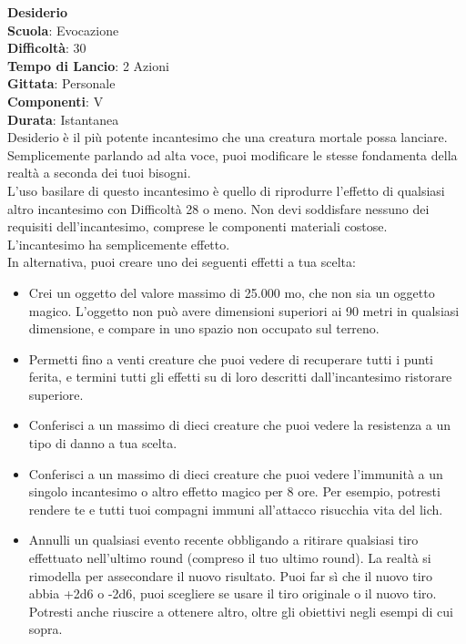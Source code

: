 \begin{multicols}{2}
\medskip\textbf{Desiderio}\\
\textbf{Scuola}: Evocazione\\
\textbf{Difficoltà}: 30\\
\textbf{Tempo di Lancio}: 2 Azioni\\
\textbf{Gittata}: Personale\\
\textbf{Componenti}: V\\
\textbf{Durata}: Istantanea\\
Desiderio è il più potente incantesimo che una creatura mortale possa lanciare. Semplicemente parlando ad alta voce, puoi modificare le stesse fondamenta della realtà a seconda dei tuoi bisogni. \\
L'uso basilare di questo incantesimo è quello di riprodurre l'effetto di qualsiasi altro incantesimo con Difficoltà 28 o meno. Non devi soddisfare nessuno dei requisiti dell'incantesimo, comprese le componenti materiali costose. L'incantesimo ha semplicemente effetto.\\
In alternativa, puoi creare uno dei seguenti effetti a tua scelta:
\begin{itemize}
	\item 
Crei un oggetto del valore massimo di 25.000 mo, che non sia un oggetto magico. L'oggetto non può avere dimensioni superiori ai 90 metri in qualsiasi dimensione, e compare in uno spazio non occupato sul terreno.
	\item 
Permetti fino a venti creature che puoi vedere di recuperare tutti i punti ferita, e termini tutti gli effetti su di loro descritti dall'incantesimo ristorare superiore. 
	\item 
Conferisci a un massimo di dieci creature che puoi vedere la resistenza a un tipo di danno a tua scelta.
	\item 
Conferisci a un massimo di dieci creature che puoi vedere l'immunità a un singolo incantesimo o altro effetto magico per 8 ore. Per esempio, potresti rendere te e tutti tuoi compagni immuni all'attacco risucchia vita del lich.
	\item 
Annulli un qualsiasi evento recente obbligando a ritirare qualsiasi tiro effettuato nell'ultimo round (compreso il tuo ultimo round). La realtà si rimodella per assecondare il nuovo risultato. Puoi far sì che il nuovo tiro abbia +2d6 o -2d6, puoi scegliere se usare il tiro originale o il nuovo tiro. Potresti anche riuscire a ottenere altro, oltre gli obiettivi negli esempi di cui sopra.\\
\end{itemize}

\end{multicols}
